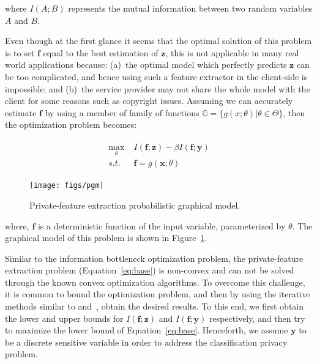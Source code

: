 \documentclass[10pt,journal,compsoc]{IEEEtran}
\begin{document}
where $I(A;B)$ represents the mutual information between two random variables $A$ and $B$.

Even though at the first glance it seems that the optimal solution of this problem is to set $\textbf{f}$ equal to the best estimation of $\textbf{z}$, this is not applicable in many real world applications because: (a)~the optimal model which perfectly predicts $\textbf{z}$ can be too complicated, and hence using such a feature extractor in the client-side is impossible; and (b)~the service provider may not share the whole model with the client for some reasons such as copyright issues. Assuming we can accurately estimate $\textbf{f}$ by using a member of family of functions $\mathbb{G}=\{g(x;\theta) | \theta \in \Theta\}$, then the optimization problem becomes:
    
\begin{align}\label{eq:base}
\begin{split}
\max_{\theta}\; & I(\textbf{f};\textbf{z}) - \beta I(\textbf{f};\textbf{y})  \\
s.t. \; & \textbf{f} = g(\textbf{x};\theta)
\end{split}
\end{align}\begin{figure}[t]
	\centering
	\texttt{[image: figs/pgm]} 
	\caption{Private-feature extraction probabilistic graphical model.}
	\label{fig:pgm}
\end{figure}

where, $\textbf{f}$ is a deterministic function of the input variable, parameterized by $\theta$. The graphical model of this problem is shown in Figure~\ref{fig:pgm}.

Similar to the information bottleneck optimization problem, the private-feature extraction problem (Equation~\ref{eq:base}) is non-convex and can not be solved through the known convex optimization algorithms. To overcome this challenge, it is common to bound the optimization problem, and then by using the iterative methods similar to \cite{barber2003} and~\cite{alemi2016}, obtain the desired results. To this end, we first obtain the lower and upper bounds for $I(\textbf{f};\textbf{z})$ and $I(\textbf{f};\textbf{y})$ respectively, and then try to maximize the lower bound of Equation~\ref{eq:base}. Henceforth, we assume $\textbf{y}$ to be a discrete sensitive variable in order to address the classification privacy problem.\\
\end{document}
